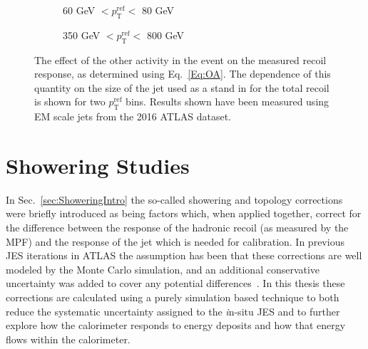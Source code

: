 \begin{figure}[!ht]
  \centering
  \begin{subfigure}{.5\textwidth}
    \centering
    \caption{60 GeV $< p_{\mathrm{T}}^{\mathrm{ref}} < $ 80 GeV}
  \end{subfigure}%
  \begin{subfigure}{.5\textwidth}  \centering
    \caption{350 GeV $< p_{\mathrm{T}}^{\mathrm{ref}} < $ 800 GeV}
  \end{subfigure}
  \caption[$\Delta^{\mathrm{OA}}$ using various cone sizes]
{\small The effect of the other activity in the event on the measured recoil response, as determined using Eq.~\ref{Eq:OA}.  The dependence of this quantity on the size of the jet used as a stand in for the total recoil is shown for two $p_{\mathrm{T}}^{\mathrm {ref}}$ bins.  Results shown have been measured using EM scale jets from the 2016 ATLAS dataset.  }
  \label{Fig:OA_ConeSize}
\end{figure}

\section{Showering Studies}

In Sec.~\ref{sec:ShoweringIntro} the so-called showering and topology corrections were briefly introduced as being factors which, when applied together, correct for the difference between the response of the hadronic recoil (as measured by the MPF) and the response of the jet which is needed for calibration.  
In previous JES iterations in ATLAS the assumption has been that these corrections are well modeled by the Monte Carlo simulation, and an additional conservative uncertainty was added to cover any potential differences~\cite{ATLAS-CONF-2015-057}.  
In this thesis these corrections are calculated using a purely simulation based technique to both reduce the systematic uncertainty assigned to the {\textit in-situ} JES and to further explore how the calorimeter responds to energy deposits and how that energy flows within the calorimeter.  

